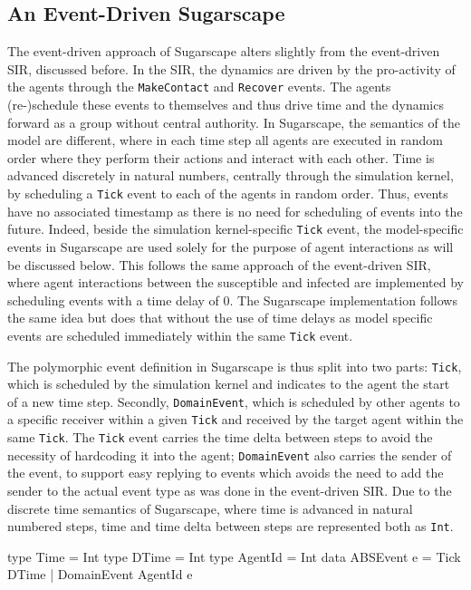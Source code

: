 \subsection{An Event-Driven Sugarscape}
The event-driven approach of Sugarscape alters slightly from the event-driven SIR, discussed before. In the SIR, the dynamics are driven by the pro-activity of the agents through the \texttt{MakeContact} and \texttt{Recover} events. The agents (re-)schedule these events to themselves and thus drive time and the dynamics forward as a group without central authority. In Sugarscape, the semantics of the model are different, where in each time step all agents are executed in random order where they perform their actions and interact with each other. Time is advanced discretely in natural numbers, centrally through the simulation kernel, by scheduling a \texttt{Tick} event to each of the agents in random order. Thus, events have no associated timestamp as there is no need for scheduling of events into the future. Indeed, beside the simulation kernel-specific \texttt{Tick} event, the model-specific events in Sugarscape are used solely for the purpose of agent interactions as will be discussed below. This follows the same approach of the event-driven SIR, where agent interactions between the susceptible and infected are implemented by scheduling events with a time delay of 0. The Sugarscape implementation follows the same idea but does that without the use of time delays as model specific events are scheduled immediately within the same \texttt{Tick} event.

The polymorphic event definition in Sugarscape is thus split into two parts: \texttt{Tick}, which is scheduled by the simulation kernel and indicates to the agent the start of a new time step. Secondly, \texttt{DomainEvent}, which is scheduled by other agents to a specific receiver within a given \texttt{Tick} and received by the target agent within the same \texttt{Tick}. The \texttt{Tick} event carries the time delta between steps to avoid the necessity of hardcoding it into the agent; \texttt{DomainEvent} also carries the sender of the event, to support easy replying to events which avoids the need to add the sender to the actual event type as was done in the event-driven SIR. Due to the discrete time semantics of Sugarscape, where time is advanced in natural numbered steps, time and time delta between steps are represented both as \texttt{Int}.

\begin{HaskellCode}
type Time       = Int
type DTime      = Int
type AgentId    = Int
data ABSEvent e = Tick DTime 
                | DomainEvent AgentId e
\end{HaskellCode}

